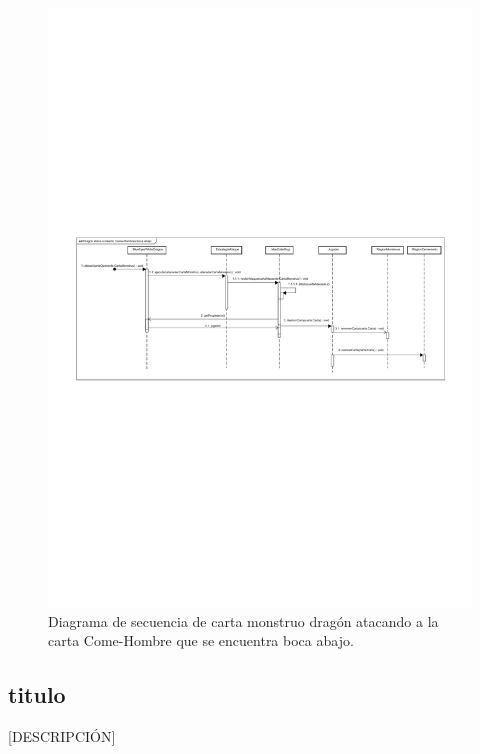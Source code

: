 \begin{figure}[H]
	\centering
	\includegraphics[scale=0.9]{includes/seq_Dragon_ataca_a_insecto_Come_Hombres_boca_abajo}
	\caption{Diagrama de secuencia de carta monstruo dragón atacando a la carta Come-Hombre que se encuentra boca abajo.}
	\label{seq_Dragon_ataca_a_insecto_Come_Hombres_boca_abajo}
\end{figure}

\subsection{titulo}

[DESCRIPCIÓN]

